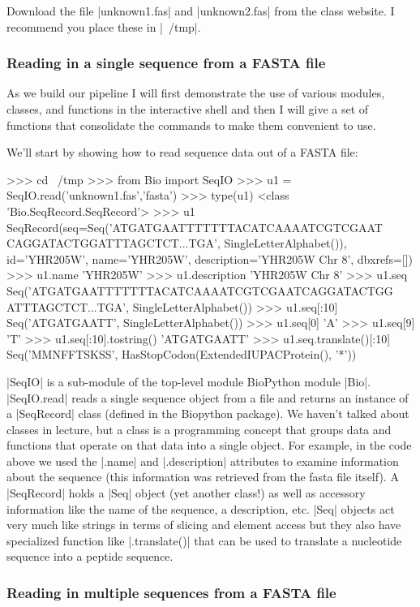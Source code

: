 \documentclass[10pt,letterpaper]{scrartcl}
\begin{document}
Download the file |unknown1.fas| and |unknown2.fas| from the class website. I recommend you place these in |~/tmp|.


\subsubsection*{Reading in a single sequence from a FASTA file}

As we build our pipeline I will first demonstrate the use of various modules, classes, and functions in the interactive shell and then I will give a set of functions that consolidate the commands to make them convenient to use.  

We'll start by showing how to read sequence data out of a FASTA file:
\begin{python}
>>> cd ~/tmp
>>> from Bio import SeqIO
>>> u1 = SeqIO.read('unknown1.fas','fasta')
>>> type(u1)
<class 'Bio.SeqRecord.SeqRecord'>
>>> u1
SeqRecord(seq=Seq('ATGATGAATTTTTTTACATCAAAATCGTCGAAT
CAGGATACTGGATTTAGCTCT...TGA', SingleLetterAlphabet()), 
id='YHR205W', name='YHR205W', description='YHR205W  Chr 8', dbxrefs=[])
>>> u1.name
'YHR205W'
>>> u1.description
'YHR205W  Chr 8'
>>> u1.seq
Seq('ATGATGAATTTTTTTACATCAAAATCGTCGAATCAGGATACTGG
ATTTAGCTCT...TGA', SingleLetterAlphabet())
>>> u1.seq[:10]
Seq('ATGATGAATT', SingleLetterAlphabet())
>>> u1.seq[0]
'A'
>>> u1.seq[9]
'T'
>>> u1.seq[:10].tostring()
'ATGATGAATT'
>>> u1.seq.translate()[:10]
Seq('MMNFFTSKSS', HasStopCodon(ExtendedIUPACProtein(), '*'))
\end{python}

|SeqIO| is a sub-module of the top-level module BioPython module |Bio|.  |SeqIO.read| reads a single sequence object from a file and returns an instance of a |SeqRecord| class (defined in the Biopython package). We haven't talked about classes in lecture, but a class is a programming concept that groups data and functions that operate on that data into a single object. For example, in the code above we used the |.name| and |.description| attributes to examine information about the sequence (this information was retrieved from the fasta file itself).  A |SeqRecord| holds a |Seq| object (yet another class!) as well as accessory information like the name of the sequence, a description, etc. |Seq| objects act very much like strings in terms of slicing and element access but they also have specialized function like |.translate()| that can be used to translate a nucleotide sequence into a peptide sequence. 

\subsubsection*{Reading in multiple sequences from a FASTA file}
\end{document}
